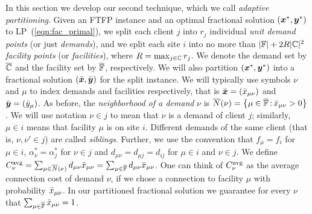 \documentclass[11pt]{article}
\begin{document}
In this section we develop our second technique, which we
call \emph{adaptive partitioning}. Given an FTFP instance
and an optimal fractional solution $(\boldsymbol{x}^\ast, \boldsymbol{y}^\ast)$
to LP~(\ref{eqn:fac_primal}), we split each client $j$ into
$r_j$ individual \emph{unit demand points} (or just
\emph{demands}), and we split each site $i$ into no more
than $|\mathbb{F}|+2R|\mathbb{C}|^2$ \emph{facility points} (or
\emph{facilities}), where $R=\max_{j\in\mathbb{C}}r_j$. We
denote the demand set by $\overline{\mathbb{C}}$ and the facility set
by $\overline{\mathbb{F}}$, respectively.  We will also partition
$(\boldsymbol{x}^\ast,\boldsymbol{y}^\ast)$ into a fractional solution
$(\bar{\boldsymbol{x}},\bar{\boldsymbol{y}})$ for the split instance.  We will
typically use symbols $\nu$ and $\mu$ to index demands and
facilities respectively, that is $\bar{\boldsymbol{x}} =
({\bar x}_{\mu\nu})$ and $\bar{\boldsymbol{y}} = ({\bar y}_{\mu})$.  As before,
the \emph{neighborhood of a demand} $\nu$ is
${\overline{N}}(\nu)={ \left\{ \mu\in\overline{\mathbb{F}} {\,:\,}
  {\bar x}_{\mu\nu}>0 \right\} }$.  We will use notation $\nu\in j$ to
mean that $\nu$ is a demand of client $j$; similarly,
$\mu\in i$ means that facility $\mu$ is on site
$i$. Different demands of the same client (that is,
$\nu,\nu'\in j$) are called \emph{siblings}.  Further, we
use the convention that $f_\mu = f_i$ for $\mu\in i$,
$\alpha_\nu^\ast = \alpha_j^\ast$ for $\nu\in j$ and
$d_{\mu\nu} = d_{\mu j} = d_{ij}$ for $\mu\in i$ and $\nu\in
j$.  We define $C^{{\mbox{\scriptsize\rm avg}}}_{\nu}
=\sum_{\mu\in{\overline{N}}(\nu)}d_{\mu\nu}{\bar x}_{\mu\nu} =
\sum_{\mu\in\overline{\mathbb{F}}}d_{\mu\nu}{\bar x}_{\mu\nu}$. 
One can think of $C^{{\mbox{\scriptsize\rm avg}}}_{\nu}$ as the
average connection cost of demand $\nu$, if we chose a
connection to facility $\mu$ with probability
${\bar x}_{\mu\nu}$. In our partitioned fractional solution we
guarantee for every $\nu$ that $\sum_{\mu\in\overline{\mathbb{F}}}
{\bar x}_{\mu\nu}=1$.
\end{document}
